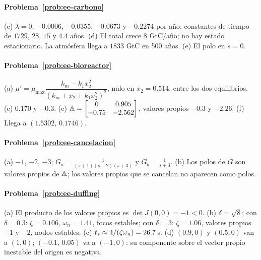 \paragraph{Problema~\ref{prob:ee-carbono}}
(c) $\lambda=0$, $-0.0006$, $-0.0355$, $-0.0673$ y $-0.2274$ por año; constantes de tiempo de $1729$, $28$, $15$ y $4.4$ años. (d) El total crece $8$ GtC/año; no hay estado estacionario. La atmósfera llega a $1833$ GtC en 500 años. (e) El polo en $s=0$.

\paragraph{Problema~\ref{prob:ee-bioreactor}}
(a) $\mu'=\mu_{\max}\dfrac{k_m-k_1x_2^2}{(k_m+x_2+k_1x_2^2)^2}$, nulo en $x_2=0.514$, entre los dos equilibrios. (c) $0.170$ y $-0.3$. (e) $\mathbb{A}=\begin{bmatrix}0&0.905\\-0.75&-2.562\end{bmatrix}$, valores propios $-0.3$ y $-2.26$. (f) Llega a $(1.5302,\,0.1746)$.

\paragraph{Problema~\ref{prob:ee-cancelacion}}
(a) $-1$, $-2$, $-3$; $G_a=\frac{1}{(s+1)(s+2)(s+3)}$ y $G_b=\frac{1}{s+3}$. (b) Los polos de $G$ son valores propios de $\mathbb{A}$; los valores propios que se cancelan no aparecen como polos.

\paragraph{Problema~\ref{prob:ee-duffing}}
(a) El producto de los valores propios es $\det J(0,0)=-1<0$. (b) $\delta=\sqrt8$; con $\delta=0.3$: $\zeta=0.106$, $\omega_n=1.41$, focos estables; con $\delta=3$: $\zeta=1.06$, valores propios $-1$ y $-2$, nodos estables. (c) $t_s\approx4/(\zeta\omega_n)=26.7$\,s. (d) $(0.9,0)$ y $(0.5,0)$ van a $(1,0)$; $(-0.1,\,0.05)$ va a $(-1,0)$: su componente sobre el vector propio inestable del origen es negativa.

\respuestaspausas
